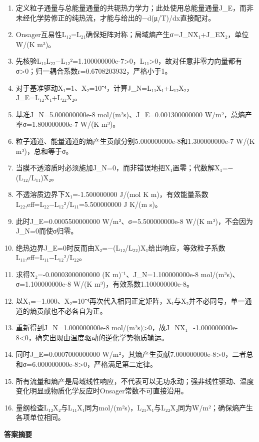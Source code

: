\documentclass[UTF8,11pt,a4paper]{ctexart}
\begin{document}
\begin{enumerate}
\item 定义粒子通量与总能量通量的共轭热力学力；此处使用总能量通量J\_E，而非未经化学势修正的纯热流，才能与给出的−d(μ/T)/dx直接配对。
\item Onsager互易性L₁₂=L₂₁确保矩阵对称；局域熵产生σ=J\_NX₁+J\_EX₂，单位W/(K m³)。
\item 先核验L₁₁L₂₂−L₁₂²=1.100000000e-7>0，L₁₁>0，故对任意非零力向量都有σ>0；归一耦合系数r=0.6708203932，严格小于1。
\item 对于基准驱动X₁=1、X₂=10⁻⁴，计算J\_N=L₁₁X₁+L₁₂X₂，J\_E=L₁₂X₁+L₂₂X₂。
\item 基准J\_N=5.000000000e-8 mol/(m²s)、J\_E=0.001300000000 W/m²，总熵产率σ=1.800000000e-7 W/(K m³)。
\item 粒子通道、能量通道的熵产生贡献分别5.000000000e-8和1.300000000e-7 W/(K m³)，总和等于σ。
\item 当膜不透溶质时必须施加J\_N=0，而非错误地把X₁置零；代数解X₁=−(L₁₂/L₁₁)X₂。
\item 不透溶质边界下X₁=-1.500000000 J/(mol K m)，有效能量系数L₂₂,eff=L₂₂−L₁₂²/L₁₁=5.500000000 J K/(m s)。
\item 此时J\_E=0.0005500000000 W/m²、σ=5.500000000e-8 W/(K m³)，不会因为J\_N=0而使σ归零。
\item 绝热边界J\_E=0时反而由X₂=−(L₁₂/L₂₂)X₁给出响应，等效粒子系数L₁₁,eff=L₁₁−L₁₂²/L₂₂。
\item 求得X₂=-0.00003000000000 (K m)⁻¹、J\_N=1.100000000e-8 mol/(m²s)、σ=1.100000000e-8 W/(K m³)，有效系数1.100000000e-8。
\item 以X₁=−1.000、X₂=10⁻⁴再次代入相同正定矩阵，X₁与X₂并不必同号，单一通道的熵贡献也不必各自为正。
\item 重新得到J\_N=1.000000000e-8 mol/(m²s)>0，故J\_NX₁=-1.000000000e-8<0，确实出现由温度驱动的逆化学势物质输运。
\item 同时J\_E=0.0007000000000 W/m²，其熵产生贡献7.000000000e-8>0，二者总和σ=6.000000000e-8>0，严格满足第二定律。
\item 所有流量和熵产是局域线性响应，不代表可以无功永动；强非线性驱动、温度变化明显或物质化学反应时Onsager常数不可直接沿用。
\item 量纲检查L₁₂X₂与L₁₁X₁同为mol/(m²s)，L₂₁X₁与L₂₂X₂同为W/m²；确保熵产生各项单位相同。
\end{enumerate}
\noindent\textbf{答案摘要}\par
\end{document}
